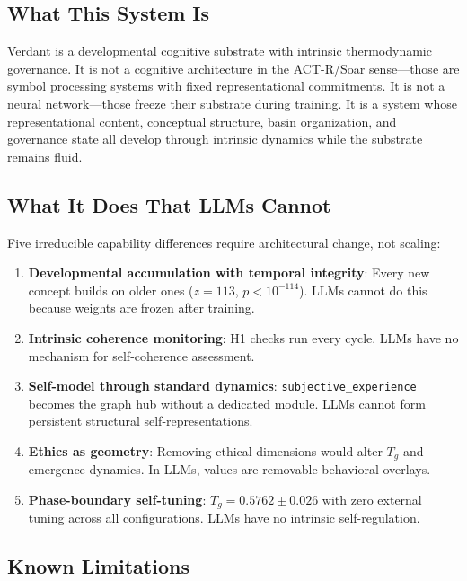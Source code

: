 \documentclass[11pt,a4paper]{article}
\begin{document}
\subsection{What This System Is}

Verdant is a developmental cognitive substrate with intrinsic thermodynamic governance. It is not a cognitive architecture in the ACT-R/Soar sense---those are symbol processing systems with fixed representational commitments. It is not a neural network---those freeze their substrate during training. It is a system whose representational content, conceptual structure, basin organization, and governance state all develop through intrinsic dynamics while the substrate remains fluid.

\subsection{What It Does That LLMs Cannot}

Five irreducible capability differences require architectural change, not scaling:

\begin{enumerate}[nosep]
    \item \textbf{Developmental accumulation with temporal integrity}: Every new concept builds on older ones ($z = 113$, $p < 10^{-114}$). LLMs cannot do this because weights are frozen after training.
    \item \textbf{Intrinsic coherence monitoring}: H1 checks run every cycle. LLMs have no mechanism for self-coherence assessment.
    \item \textbf{Self-model through standard dynamics}: \texttt{subjective\_experience} becomes the graph hub without a dedicated module. LLMs cannot form persistent structural self-representations.
    \item \textbf{Ethics as geometry}: Removing ethical dimensions would alter $T_g$ and emergence dynamics. In LLMs, values are removable behavioral overlays.
    \item \textbf{Phase-boundary self-tuning}: $T_g = 0.5762 \pm 0.026$ with zero external tuning across all configurations. LLMs have no intrinsic self-regulation.
\end{enumerate}

\subsection{Known Limitations}
\end{document}
